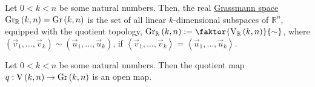 \begin{definition} Let $0<k<n$ be some natural numbers. Then, the real \ul{Grassmann space} $\Gr{k}{n}{\mathbb{R}}=\Gr{k}{n}$ is the set of all linear $k$-dimensional subspaces of $\mathbb{R}^n$, equipped with the quotient topology,
$\Gr{k}{n}{\mathbb{R}}:=\faktor{\St{k}{n}{\mathbb{R}}}{\sim}$,
where $(\vec{v}_1,\ldots,\vec{v}_k)\sim(\vec{u}_1,\ldots,\vec{u}_k)$, if $\left<\vec{v}_1,\ldots,\vec{v}_k\right>=\left<\vec{u}_1,\ldots,\vec{u}_k\right>$.
\end{definition}

\begin{lemma}\label{lem:q_open} Let $0<k<n$ be some natural numbers. Then the quotient map $q:\St{k}{n}\to\Gr{k}{n}$ is an open map.
\end{lemma}
